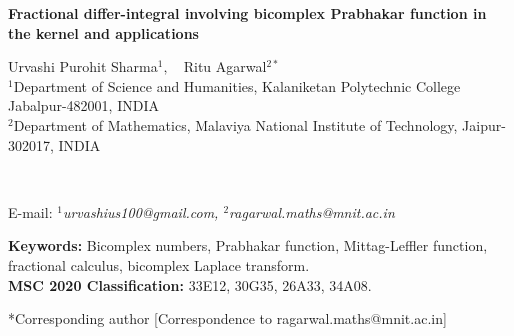 \documentclass[a4paper,12pt]{article}
\theoremstyle{remark}
\begin{document}
		
	\begin{center}
		{{\Large \textbf {Fractional differ-integral involving bicomplex
Prabhakar function in the kernel and applications %
}}
			\medskip
			
				
	{\sc  Urvashi Purohit Sharma$^{1},$\ \ Ritu Agarwal$^{2*}$ }\\
	{\footnotesize $^{1}$Department of Science and Humanities, Kalaniketan Polytechnic College Jabalpur-482001, INDIA}\\
	{  \footnotesize $^{2}$Department of Mathematics,
		Malaviya National Institute of Technology, Jaipur-302017, INDIA}
}\\
{\footnotesize E-mail: {\it $^{1}$urvashius100@gmail.com,  $^{2} $ragarwal.maths@mnit.ac.in }
	
}        \end{center}
\thispagestyle{empty}
	
\hrulefill
\begin{abstract}
\indent


This paper introduces the bicomplex Prabhakar derivative, extending fractional calculus to four-dimensional bicomplex spaces.  
Using the generalized kernel involving bicomplex Prabhakar function, we construct the bicomplex Prabhakar derivative and prove fundamental operational properties including linearity, composition rules, and connections to Riemann-Liouville and Caputo operators. We further investigate how fractional operators act on the bicomplex Prabhakar function itself, developing integral representations and transformation formulas. 

This work provides a rigorous foundation for modeling complex phenomena with memory effects and multi-dimensional coupling in bicomplex domains. The rich algebraic structure of bicomplex numbers, combined with the flexibility of Prabhakar kernels, offers a versatile framework applicable across diverse scientific and engineering disciplines.

\end{abstract}

\hrulefill
	
{\small \textbf{Keywords:} } Bicomplex numbers, Prabhakar function, Mittag-Leffler function, fractional calculus, bicomplex Laplace transform.\\

\textbf{MSC 2020 Classification:} 33E12, 30G35, 26A33, 34A08.

*Corresponding author [Correspondence to ragarwal.maths@mnit.ac.in]
	
\end{document}
